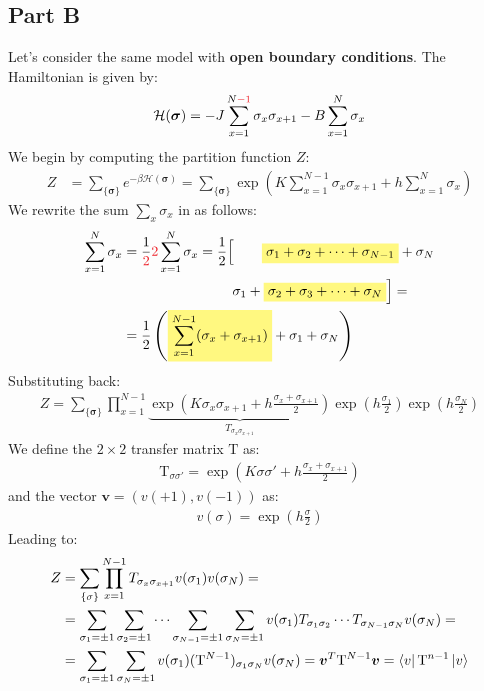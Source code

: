 \documentclass[12pt,a4paper]{report}
\begin{document}
\subsection{Part B}
Let's consider the same model with \textbf{open boundary conditions}. The Hamiltonian is given by:
\begin{align*}
    \mathcal{H}(\bm{\sigma}) = -J \sum_{x=1}^{N\textcolor{Red}{-1}} \sigma_x \sigma_{x+1} - B \sum_{x=1}^N \sigma_x
\end{align*}
We begin by computing the partition function $Z$:
\begin{align*}
    Z &= \sum_{\{\bm{\sigma}\}} e^{- \beta \mathcal{H}(\bm{\sigma})} = \sum_{\{\bm{\sigma}\}} \exp\left(K \sum_{x=1}^{N-1} \sigma_x \sigma_{x+1} + h \sum_{x=1}^N \sigma_x\right)
\end{align*} 
We rewrite the sum $\sum_x \sigma_x$ in as follows:
\begin{align}\label{eqn:sum-rewrite}
    \sum_{x=1}^N \sigma_x &= \frac{1}{\textcolor{Red}{2}} \textcolor{Red}{2} \sum_{x=1}^N \sigma_x = \frac{1}{2} \Big[\phantom{\sigma_1 + }\> \hlc{Yellow}{\sigma_1 + \sigma_2 + \dots + \sigma_{N-1}} + \sigma_N \\  \nonumber
    &\hspace{7.9em}\sigma_1 + \hlc{Yellow}{\sigma_2  + \sigma_3 + \dots + \sigma_N}\Big] = \\ \nonumber
    &= \frac{1}{2} \left(\hlc{Yellow}{\sum_{x=1}^{N-1} (\sigma_x + \sigma_{x+1}) }+ \sigma_1 + \sigma_N\right) 
\end{align}
Substituting back:
\begin{align*}
    Z = \sum_{\{\bm{\sigma}\}} \prod_{x=1}^{N-1} \underbrace{\exp\left(K \sigma_x \sigma_{x+1} + h \frac{\sigma_x +\sigma_{x+1}}{2} \right)}_{T_{\sigma_x \sigma_{x+1}}} \exp\left(h \frac{\sigma_1}{2} \right) \exp\left(h \frac{\sigma_N}{2} \right)
\end{align*}
We define the $2\times 2$ transfer matrix $\mathrm{T}$ as:
\begin{align*}
    \mathrm{T}_{\sigma \sigma'} = \exp\left(K \sigma \sigma' + h \frac{\sigma_x + \sigma_{x+1}}{2} \right)
\end{align*}
and the vector $\bm{v} = (v(+1), v(-1))$ as:
\begin{align*}
    v(\sigma) = \exp\left(h\frac{\sigma}{2} \right)
\end{align*}
Leading to:
\begin{align*}
    Z &= \sum_{\{\sigma\}} \prod_{x=1}^{N-1} T_{\sigma_x \sigma_{x+1}} v(\sigma_1) v(\sigma_N) =\\
    &= \sum_{\sigma_1=\pm 1} \sum_{\sigma_2 = \pm 1} \cdots \sum_{\sigma_{N-1} = \pm 1} \sum_{\sigma_N=\pm 1} v(\sigma_1) T_{\sigma_1 \sigma_2} \cdots T_{\sigma_{N-1} \sigma_{N}} v(\sigma_N) =\\
    &=\sum_{\sigma_1 = \pm 1} \sum_{\sigma_N = \pm 1} v(\sigma_1) (\mathrm{T}^{N-1})_{\sigma_1 \sigma_N} v(\sigma_N) = \bm{v}^T \mathrm{T}^{N-1} \bm{v} = \bra{v} \mathrm{T}^{n-1} \ket{v}
\end{align*}
\end{document}
